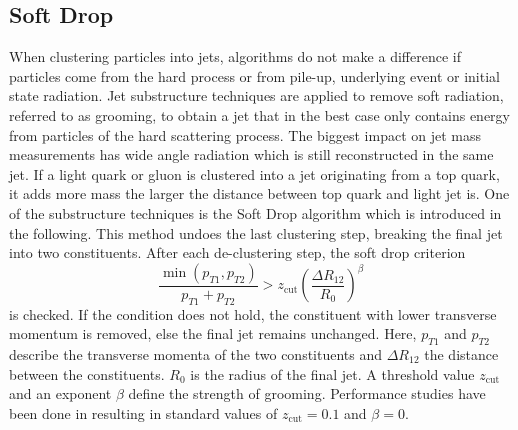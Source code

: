 \subsection{Soft Drop}
\label{sec:sd}
	When clustering particles into jets, algorithms do not make a difference if particles come from the hard process or from pile-up, underlying event or initial state radiation. Jet substructure techniques are applied to remove soft radiation, referred to as grooming, to obtain a jet that in the best case only contains energy from particles of the hard scattering process. The biggest impact on jet mass measurements has wide angle radiation which is still reconstructed in the same jet. If a light quark or gluon is clustered into a jet originating from a top quark, it adds more mass the larger the distance between top quark and light jet is. One of the substructure techniques is the Soft Drop algorithm \cite{softdrop} which is introduced in the following. This method undoes the last clustering step, breaking the final jet into two constituents. After each de-clustering step, the soft drop criterion
	\begin{equation}
	\frac{\min(p_{T1}, p_{T2})}{p_{T1} + p_{T2}} > z_\text{cut} \left( \frac{\Delta R_{12}}{R_0}\right)^\beta
	\label{eq:sd}
	\end{equation}
	is checked. If the condition does not hold, the constituent with lower transverse momentum is removed, else the final jet remains unchanged. Here, $p_{T1}$ and $p_{T2}$ describe the transverse momenta of the two constituents and $\Delta R_{12}$ the distance between the constituents. $R_0$ is the radius of the final jet. A threshold value $z_\text{cut}$ and an exponent $\beta$ define the strength of grooming. Performance studies have been done in \cite{softdropvalues} resulting in standard values of $z_\text{cut} = 0.1$ and $\beta =0$.	
		
